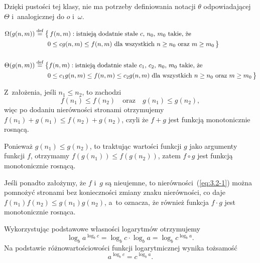 Dzięki pustości tej klasy, nie ma potrzeby definiowania notacji $\theta$ odpowiadającej $\Theta$ i~analogicznej do $o$ i~$\omega$.

\exercise{} %
\[
	\begin{split}
		\Omega(g(n,m)) &\stackrel{\text{\scriptsize def}}{=} \bigl\{\,f(n,m):\text{istnieją dodatnie stałe $c$,~$n_0$,~$m_0$ takie, że} \\
		&\qquad 0 \le cg(n,m) \le f(n,m) \text{ dla wszystkich $n \ge n_0$ oraz $m \ge m_0$}\,\bigr\} \\[5mm]
		\Theta(g(n,m)) &\stackrel{\text{\scriptsize def}}{=} \bigl\{f(n,m):\text{istnieją dodatnie stałe $c_1$,~$c_2$,~$n_0$,~$m_0$ takie, że} \\
		&\qquad 0 \le c_1g(n,m) \le f(n,m) \le c_2g(n,m) \text{ dla wszystkich $n \ge n_0$ oraz $m \ge m_0$}\,\bigr\}
	\end{split}
\]


\exercise{} %
Z~założenia, jeśli $n_1\le n_2$, to zachodzi
\begin{equation}
	f(n_1) \le f(n_2) \quad\text{oraz}\quad g(n_1) \le g(n_2), \label{eq:3.2-1}
\end{equation}
więc po dodaniu nierówności stronami otrzymujemy $f(n_1)+g(n_1)\le f(n_2)+g(n_2)$, czyli że $f+g$ jest funkcją monotonicznie rosnącą.

Ponieważ $g(n_1)\le g(n_2)$, to traktując wartości funkcji $g$ jako argumenty funkcji $f$, otrzymamy $f(g(n_1))\le f(g(n_2))$, zatem $f\circ g$ jest funkcją monotonicznie rosnącą.

Jeśli ponadto założymy, że $f$ i~$g$ są nieujemne, to nierówności~(\ref{eq:3.2-1}) można pomnożyć stronami bez konieczności zmiany znaku nierówności, co daje $f(n_1)f(n_2)\le g(n_1)g(n_2)$, a~to oznacza, że również funkcja $f\cdot g$ jest monotonicznie rosnąca.

\exercise{} %
Wykorzystując podstawowe własności logarytmów otrzymujemy
\[
	\log_ba^{\log_bc} = \log_bc\cdot\log_ba = \log_bc^{\log_ba}.
\]
Na podstawie różnowartościowości funkcji logarytmicznej wynika tożsamość
\[
	a^{\log_bc} = c^{\log_ba}.
\]

